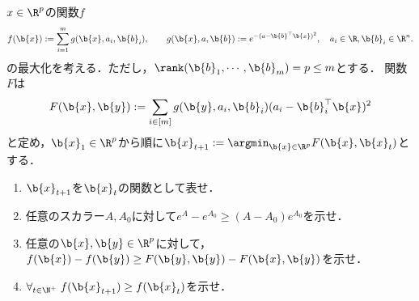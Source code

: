 \documentclass[uplatex,dvipdfmx]{jsarticle}
\begin{document}
\begin{tcolorbox}[colframe=ForestGreen, colback=ForestGreen!10!white,breakable,colbacktitle=ForestGreen!40!white,coltitle=black,fonttitle=\bfseries\sffamily,
    title=第４問]
    \begin{problem}\label{prob-18-8-4}
        $x\in\R^p$の関数$f$
        \[f(\b{x}):=\sum_{i=1}^mg(\b{x},a_i,\b{b}_i),\qquad g(\b{x},a,\b{b}):=e^{-(a-\b{b}^\top\b{x})^2},\quad a_i\in\R,\b{b}_i\in\R^n.\]
        の最大化を考える．ただし，$\rank(\b{b}_1,\cdots,\b{b}_m)=p\le m$とする．
        関数$F$は
        \[F(\b{x},\b{y}):=\sum_{i\in[m]}g(\b{y},a_i,\b{b}_i)(a_i-\b{b}_i^\top\b{x})^2\]
        と定め，$\b{x}_1\in\R^p$から順に$\b{x}_{t+1}:=\argmin_{\b{x}\in\R^p}F(\b{x},\b{x}_t)$とする．
        \begin{enumerate}[{問}1]
            \item $\b{x}_{t+1}$を$\b{x}_t$の関数として表せ．
            \item 任意のスカラー$A,A_0$に対して$e^{A}-e^{A_0}\ge(A-A_0)e^{A_0}$を示せ．
            \item 任意の$\b{x},\b{y}\in\R^p$に対して，$f(\b{x})-f(\b{y})\ge F(\b{y},\b{y})-F(\b{x},\b{y})$を示せ．
            \item $\forall_{t\in\N^+}\;f(\b{x}_{t+1})\ge f(\b{x}_t)$を示せ．
        \end{enumerate}
    \end{problem}
\end{tcolorbox}
\end{document}

